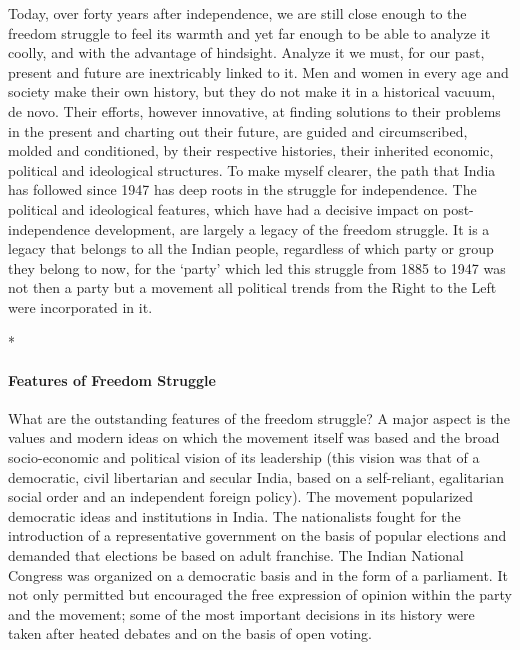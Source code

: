 Today, over forty years after independence, we are still close enough to the freedom struggle to feel its warmth and yet far enough to be able to analyze it coolly, and with the advantage of hindsight. Analyze it we must, for our past, present and future are inextricably linked to it. Men and women in every age and society make their own history, but they do not make it in a historical vacuum, de novo. Their efforts, however innovative, at finding solutions to their problems in the present and charting out their future, are guided and circumscribed, molded and conditioned, by their respective histories, their inherited economic, political and ideological structures. To make myself clearer, the path that India has followed since 1947 has deep roots in the struggle for independence. The political and ideological features, which have had a decisive impact on post-independence development, are largely a legacy of the freedom struggle. It is a legacy that belongs to all the Indian people, regardless of which party or group they belong to now, for the `party' which led this struggle from 1885 to 1947 was not then a party but a movement all political trends from the Right to the Left were incorporated in it.

\begin{center}*\end{center}

\paragraph{Features of Freedom Struggle}
What are the outstanding features of the freedom struggle? A major aspect is the values and modern ideas on which the movement itself was based and the broad socio-economic and political vision of its leadership (this vision was that of a democratic, civil libertarian and secular India, based on a self-reliant, egalitarian social order and an independent foreign policy). The movement popularized democratic ideas and institutions in India. The nationalists fought for the introduction of a representative government on the basis of popular elections and demanded that elections be based on adult franchise. The Indian National Congress was organized on a democratic basis and in the form of a parliament. It not only permitted but encouraged the free expression of opinion within the party and the movement; some of the most important decisions in its history were taken after heated debates and on the basis of open voting.

